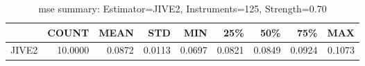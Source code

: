 \begin{table}[ht]
\centering
\caption{mse summary: Estimator=JIVE2, Instruments=125, Strength=0.70}
\begin{tabular}{lrrrrrrrr}
\toprule
 & COUNT & MEAN & STD & MIN & 25\% & 50\% & 75\% & MAX \\
\midrule
JIVE2 & 10.0000 & 0.0872 & 0.0113 & 0.0697 & 0.0821 & 0.0849 & 0.0924 & 0.1073 \\
\bottomrule
\end{tabular}
\end{table}
